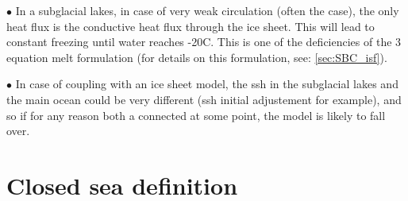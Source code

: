 \documentclass[../main/NEMO_manual]{subfiles}
\begin{document}
\begin{description}
\item $\bullet$ In a subglacial lakes, in case of very weak circulation (often the case), the only heat flux is the conductive heat flux through the ice sheet. 
  This will lead to constant freezing until water reaches -20C. 
  This is one of the deficiencies of the 3 equation melt formulation (for details on this formulation, see: \autoref{sec:SBC_isf}).
\item $\bullet$ In case of coupling with an ice sheet model, 
  the ssh in the subglacial lakes and the main ocean could be very different (ssh initial adjustement for example), 
  and so if for any reason both a connected at some point, the model is likely to fall over.\\
\end{description}

\section{Closed sea definition}
\label{sec:clocfg}
\end{document}
